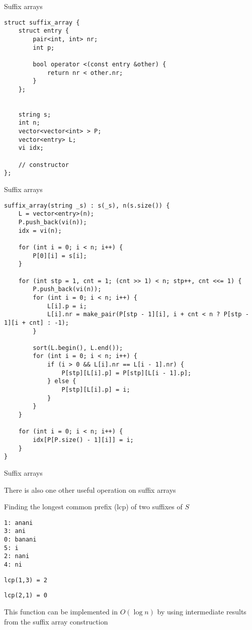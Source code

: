 \begin{frame}[fragile]{Suffix arrays}
    \begin{verbatim}
struct suffix_array {
    struct entry {
        pair<int, int> nr;
        int p;

        bool operator <(const entry &other) {
            return nr < other.nr;
        }
    };


    string s;
    int n;
    vector<vector<int> > P;
    vector<entry> L;
    vi idx;

    // constructor
};
\end{verbatim}
\end{frame}

\begin{frame}[fragile]{Suffix arrays}
    \begin{verbatim}
suffix_array(string _s) : s(_s), n(s.size()) {
    L = vector<entry>(n);
    P.push_back(vi(n));
    idx = vi(n);

    for (int i = 0; i < n; i++) {
        P[0][i] = s[i];
    }

    for (int stp = 1, cnt = 1; (cnt >> 1) < n; stp++, cnt <<= 1) {
        P.push_back(vi(n));
        for (int i = 0; i < n; i++) {
            L[i].p = i;
            L[i].nr = make_pair(P[stp - 1][i], i + cnt < n ? P[stp - 1][i + cnt] : -1);
        }

        sort(L.begin(), L.end());
        for (int i = 0; i < n; i++) {
            if (i > 0 && L[i].nr == L[i - 1].nr) {
                P[stp][L[i].p] = P[stp][L[i - 1].p];
            } else {
                P[stp][L[i].p] = i;
            }
        }
    }

    for (int i = 0; i < n; i++) {
        idx[P[P.size() - 1][i]] = i;
    }
}
\end{verbatim}
\end{frame}

\begin{frame}[fragile]{Suffix arrays}
    \bi
        \item There is also one other useful operation on suffix arrays
        \item Finding the longest common prefix (lcp) of two suffixes of $S$
    \ei

    \begin{verbatim}
1: anani
3: ani
0: banani
5: i
2: nani
4: ni
    \end{verbatim}

    \bi
\item \texttt{lcp(1,3) = 2}
\item \texttt{lcp(2,1) = 0}
    \vspace{10pt}
\item This function can be implemented in $O(\log n)$ by using intermediate results from the suffix array construction
    \ei
\end{frame}

